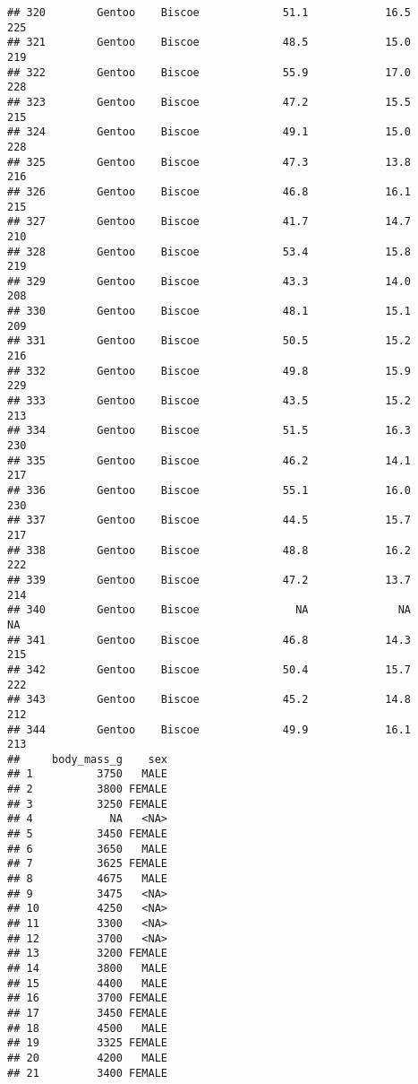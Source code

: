 \documentclass[
]{article}
\begin{document}
\begin{verbatim}
## 320        Gentoo    Biscoe             51.1            16.5               225
## 321        Gentoo    Biscoe             48.5            15.0               219
## 322        Gentoo    Biscoe             55.9            17.0               228
## 323        Gentoo    Biscoe             47.2            15.5               215
## 324        Gentoo    Biscoe             49.1            15.0               228
## 325        Gentoo    Biscoe             47.3            13.8               216
## 326        Gentoo    Biscoe             46.8            16.1               215
## 327        Gentoo    Biscoe             41.7            14.7               210
## 328        Gentoo    Biscoe             53.4            15.8               219
## 329        Gentoo    Biscoe             43.3            14.0               208
## 330        Gentoo    Biscoe             48.1            15.1               209
## 331        Gentoo    Biscoe             50.5            15.2               216
## 332        Gentoo    Biscoe             49.8            15.9               229
## 333        Gentoo    Biscoe             43.5            15.2               213
## 334        Gentoo    Biscoe             51.5            16.3               230
## 335        Gentoo    Biscoe             46.2            14.1               217
## 336        Gentoo    Biscoe             55.1            16.0               230
## 337        Gentoo    Biscoe             44.5            15.7               217
## 338        Gentoo    Biscoe             48.8            16.2               222
## 339        Gentoo    Biscoe             47.2            13.7               214
## 340        Gentoo    Biscoe               NA              NA                NA
## 341        Gentoo    Biscoe             46.8            14.3               215
## 342        Gentoo    Biscoe             50.4            15.7               222
## 343        Gentoo    Biscoe             45.2            14.8               212
## 344        Gentoo    Biscoe             49.9            16.1               213
##     body_mass_g    sex
## 1          3750   MALE
## 2          3800 FEMALE
## 3          3250 FEMALE
## 4            NA   <NA>
## 5          3450 FEMALE
## 6          3650   MALE
## 7          3625 FEMALE
## 8          4675   MALE
## 9          3475   <NA>
## 10         4250   <NA>
## 11         3300   <NA>
## 12         3700   <NA>
## 13         3200 FEMALE
## 14         3800   MALE
## 15         4400   MALE
## 16         3700 FEMALE
## 17         3450 FEMALE
## 18         4500   MALE
## 19         3325 FEMALE
## 20         4200   MALE
## 21         3400 FEMALE

\end{verbatim}
\end{document}
